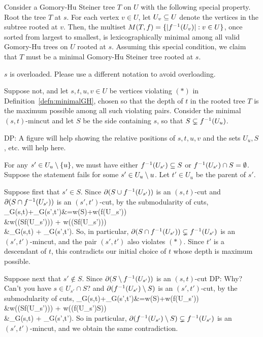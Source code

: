 \iffalse

Consider a Gomory-Hu Steiner tree $T$ on $U$ with the following special property. Root the tree $T$ at $s$. For each vertex $v\in U$, let $U_v\subseteq U$ denote the vertices in the subtree rooted at $v$. Then, the multiset $M(T,f)=\{ |f^{-1}(U_v)| : v\in U\}$, once sorted from largest to smallest, is lexicographically minimal among all valid Gomory-Hu trees on $U$ rooted at $s$. Assuming this special condition, we claim that $T$ must be a minimal Gomory-Hu Steiner tree rooted at $s$.

\alert{$s$ is overloaded. Please use a different notation to avoid overloading.}

Suppose not, and let $s,t,u,v\in U$ be vertices violating $(*)$ in Definition~\ref{defn:minimalGH}, chosen so that the depth of $t$ in the rooted tree $T$ is the maximum possible among all such violating pairs. Consider the minimal $(s,t)$-mincut and let $S$ be the side containing $s$, so that $S\subsetneq f^{-1}(U_u)$.

\alert{DP: A figure will help showing the relative positions of $s, t, u, v$ and the sets $U_u, S$, etc. will help here.}

\BCL{}
For any $s'\in U_u\setminus \{u\}$, we must have either $f^{-1}(U_{s'})\subseteq S$ or $f^{-1}(U_{s'})\cap S=\emptyset$.
\ECL
\BP
Suppose the statement fails for some $s'\in U_u\setminus u$. Let $t'\in U_u$ be the parent of $s'$.

Suppose first that $s'\in S$. Since $\partial(S\cup f^{-1}(U_{s'}))$ is an $(s,t)$-cut and $\partial(S\cap f^{-1}(U_{s'}))$ is an $(s',t')$-cut, by the submodularity of cuts,
\BAL
\mincut_G(s,t)+\mincut_G(s',t')&=w(\pt S)+w(\pt f\inv(U_{s'})) 
\\&\ge w(\pt(S\cup f\inv(U_{s'}))) + w(\pt(S\cap f\inv(U_{s'}))) 
\\&\ge \mincut_G(s,t) + \mincut_G(s',t').
\EAL
So, in particular, $\partial(S\cap f^{-1}(U_{s'})) \subsetneq f^{-1}(U_{s'})$ is an $(s',t')$-mincut, and the pair $(s',t')$ also violates $(*)$. Since $t'$ is a descendant of $t$, this contradicts our initial choice of $t$ whose depth is maximum possible. 

Suppose next that $s'\notin S$. Since $\partial(S\setminus f^{-1}(U_{s'}))$ is an $(s,t)$-cut \alert{DP: Why? Can't you have $s\in U_{s'}\cap S$?} and $\partial(f^{-1}(U_{s'})\setminus S)$ is an $(s',t')$-cut, by the submodularity of cuts,
\BAL
\mincut_G(s,t)+\mincut_G(s',t')&=w(\pt S)+w(\pt f\inv(U_{s'})) 
\\&\ge w(\pt(S\sm f\inv(U_{s'}))) + w(\pt(f\inv(U_{s'})\sm S)) 
\\&\ge \mincut_G(s,t) + \mincut_G(s',t').
\EAL
So in particular, $\partial(f^{-1}(U_{s'})\setminus S)\subsetneq f^{-1}(U_{s'})$ is an $(s',t')$-mincut, and we obtain the same contradiction. 
\EP

